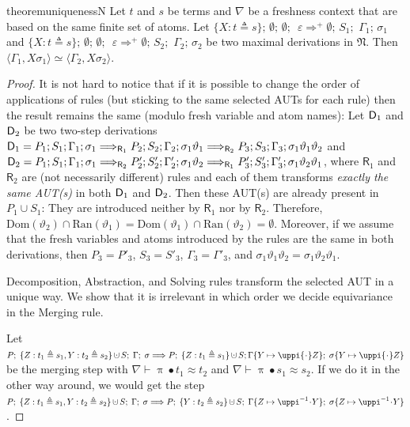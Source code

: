 \documentclass{llncs}
\newcommand{\dom}{\mathrm{Dom}}
\newcommand{\ran}{\mathrm{Ran}}
\newcommand{\Lra}{\Longrightarrow}
\newcommand{\frN}{\mathfrak N}
\newcommand{\permap}{{\mkern 1mu\cdot \mkern 1mu}}
\newcommand{\permef}{\bullet}
\newcommand\ppi{\uppi}
\newcommand{\dotcup}{\ensuremath{\mathop{\mathaccent\cdot\cup}}}
\newcommand{\np}[2]{\langle #1, \allowbreak #2\rangle}
\newcommand{\nablag}{\Gamma}
\begin{document}
\begin{restatable}{theorem}{uniquenessN}
  \label{thm:uniqueness}
  Let $t$ and $s$ be terms and $\nabla$ be a freshness context that are based on the same finite set of atoms.
  Let $\{X: t\triangleq s\};\, \emptyset;\, \emptyset;\, $
  $\varepsilon \Lra^+ \emptyset;\,S_1;$ $ \nablag_1;\, \sigma_1$ and
  $\{X: t\triangleq s\};\, \emptyset;\, \emptyset;\, $ $\varepsilon
  \Lra^+ \emptyset;\,S_2;$ $ \nablag_2;\, \sigma_2$ be two maximal
  derivations in $\frN$. Then $\np{\nablag_1}{X\sigma_1}\simeq
  \np{\nablag_2}{X\sigma_2}$.
\end{restatable}

\begin{proof}
It is not hard to notice that if it is possible to change the order of
applications of rules (but sticking to the same selected AUTs for each
rule) then the result remains the same (modulo fresh variable and atom names): Let ${\sf D}_1$ and ${\sf D}_2$ be two two-step derivations ${\sf D}_1 =
P_1;S_1;\Gamma_1;\sigma_1 \Lra_{\mathsf{R}_1} P_2;S_2;\Gamma_2;\sigma_1\vartheta_1
\Lra_{\mathsf{R}_2} P_3; S_3; \Gamma_3; \sigma_1\vartheta_1\vartheta_2$ and
${\sf D}_2= P_1;S_1;\Gamma_1;\sigma_1 \Lra_{\mathsf{R}_2}
P'_2;S'_2;\Gamma'_2;\sigma_1\vartheta_2 \Lra_{\mathsf{R}_1} P'_3; S'_3;\allowbreak\Gamma'_3;
\sigma_1\vartheta_2\vartheta_1$, where
$\mathsf{R}_1$ and $\mathsf{R}_2$ are (not necessarily different) rules and
each of them transforms \emph{exactly the same AUT(s)} in both ${\sf D}_1$ and
${\sf D}_2$. Then these AUT(s) are already present in $P_1\cup S_1$: They are introduced neither by $\mathsf{R}_1$ nor by $\mathsf{R}_2$. Therefore, $\dom(\vartheta_2)\cap \ran(\vartheta_1) = \dom(\vartheta_1)\cap \ran(\vartheta_2) = \emptyset$. Moreover, if we assume that the fresh variables and atoms introduced by the rules are the same in both derivations, then $P_3=P'_3$, $S_3=S'_3$, $\Gamma_3=\Gamma'_3$, and $\sigma_1\vartheta_1\vartheta_2=\sigma_1\vartheta_2\vartheta_1$.

Decomposition, Abstraction, and Solving rules transform the selected AUT in a unique way. We show that it is irrelevant in which order we decide equivariance in the Merging rule.

Let $P ;\; \{Z : t_1 \triangleq s_1, Y : t_2 \triangleq s_2\}\dotcup S ;\; \Gamma;\; \sigma \Lra P ;\; \{Z : t_1 \triangleq s_1\}\dotcup S ;\allowbreak \Gamma \{Y\mapsto \ppi \permap Z\};\; \sigma\{Y \mapsto \ppi \permap Z\} $ be the merging step with $\nabla \vdash \ppi\permef t_1\approx t_2$ and $\nabla \vdash \ppi\permef s_1\approx s_2$. If we do it in the other way around, we would get the step $P ;\; \{Z : t_1 \triangleq s_1, Y : t_2 \triangleq s_2\}\dotcup S ;\; \Gamma;\; \sigma \Lra P ;\; \{Y : t_2 \triangleq s_2\}\dotcup S ;\; \Gamma\{Z\mapsto \ppi^{-1} \permap Y\};\; \sigma\{Z \mapsto \ppi^{-1} \permap Y\} $.


\end{proof}
\end{document}

